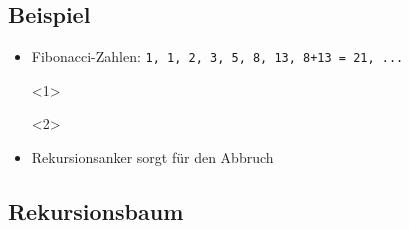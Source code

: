 \subsection*{Beispiel}
\begin{frame}
    \slidehead

    \begin{itemize}
        \item Fibonacci-Zahlen: \texttt{1, 1, 2, 3, 5, 8, 13, 8+13 = 21, ...}
            \begin{onlyenv}<1>
            \end{onlyenv}

            \begin{onlyenv}<2>
            \end{onlyenv}

        \item<2> Rekursionsanker sorgt für den Abbruch
    \end{itemize}

\end{frame}

\subsection{Rekursionsbaum}

\newcommand{\mytree}{
    \ifnum \val = 0
        \draw[draw=., ultra thick] (\x,\y) rectangle 	++(0.75,0.75);
        \node at (\x+0.375,\y+0.375) {f(\the\val)};
    \fi
    \ifnum \val = 1
        \draw[draw=., ultra thick] (\x,\y) rectangle 	++(0.75,0.75);
        \node at (\x+0.375,\y+0.375) {f(\the\val)};
    \fi
    \ifnum \val > 1

        \draw[draw=., ultra thick] (\x,\y) rectangle ++(0.75,0.75);
        \node at (\x+0.375,\y+0.375) {f(\the\val)};

        \advance \val -1
        \advance \y -2
        \tmp=-\val*0.01
        \advance \tmp -1

        \advance \x \tmp
        \draw [->, thick] (\x-\tmp,\y+2) -- (\x+0.75,\y+0.75);
        \mytree;

        \tmp=\val*0.01
        \advance \tmp 1

        \advance \x \tmp
        \advance \val -1
        \tmp=\val*0.01
        \advance \tmp 1

        \advance \x \tmp

        \draw [->, thick] (\x-\tmp+0.75,\y+2) -- (\x,\y+0.75);
        \mytree;

        \tmp=-\val*0.01
        \advance \tmp -1

        \advance \val +2
        \advance \x \tmp
        \advance \y +2
    \fi
}


